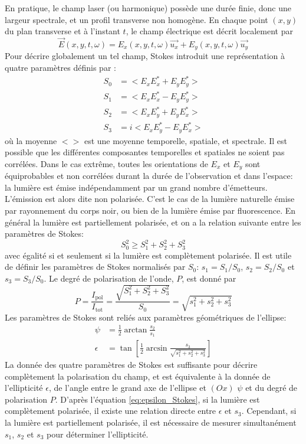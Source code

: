 En pratique, le champ laser (ou harmonique) possède une durée finie, donc une largeur spectrale, et un profil transverse non homogène. En chaque point $(x,y)$ du plan transverse et à l'instant $t$, le champ électrique est décrit localement par
\begin{equation}
\vec{E}(x,y,t,\omega) = E_x(x,y,t,\omega) \vec{u_x} + E_y(x,y,t,\omega) \vec{u_y}
\end{equation}
Pour décrire globalement un tel champ, Stokes introduit une représentation à quatre paramètres définis par :
\begin{align}
S_0 & = <E_x E_x^* + E_y E_y^*> \\
S_1 & = <E_x E_x^* - E_y E_y^*> \\
S_2 & = <E_x E_y^* + E_y E_x^*>\\
S_3 & = i <E_x E_y^* - E_y E_x^*>
\end{align}
où la moyenne $< >$ est une moyenne temporelle, spatiale, et spectrale.
Il est possible que les différentes composantes temporelles et spatiales ne soient pas corrélées. Dans le cas extrême, toutes les orientations de $E_x$ et $E_y$ sont équiprobables et non corrélées durant la durée de l'observation et dans l'espace: la lumière est émise indépendamment par un grand nombre d'émetteurs. L'émission est alors dite non polarisée. C'est le cas de la lumière naturelle émise par rayonnement du corps noir, ou bien de la lumière émise par fluorescence. En général la lumière est partiellement polarisée, et on a la relation suivante entre les paramètres de Stokes:
\begin{equation}
S_0^2 \geqslant S_1^2 + S_2^2 + S_3^2
\end{equation}
avec égalité si et seulement si la lumière est complètement polarisée. Il est utile de définir les paramètres de Stokes normalisés par $S_0$: $s_1 = S_1 /S_0$, $s_2 = S_2 /S_0$ et $s_3 = S_3 /S_0$.
Le degré de polarisation de l'onde, $P$, est donné par 
\begin{equation}
P = \frac{I_{\text{pol}}}{I_{\text{tot}}} = \frac{\sqrt{S_1^2 + S_2^2 + S_3^2}}{S_0} = \sqrt{s_1^2 + s_2^2 + s_3^2}
\label{eq:degrépolarisation}
\end{equation}
Les paramètres de Stokes sont reliés aux paramètres géométriques de l'ellipse:
\begin{align}
\psi & = \frac{1}{2} \arctan \frac{s_2}{s_1} \label{eq:PsiStokes} \\
\epsilon & = \tan \left[ \frac{1}{2} \arcsin \frac{s_3}{\sqrt{s_1^2 + s_2^2 + s_3^2}} \right]
\label{eq:epsilon_Stokes}
\end{align}
La donnée des quatre paramètres de Stokes est suffisante pour décrire complètement la polarisation du champ, et est équivalente à la donnée de l'ellipticité $\epsilon$, de l'angle entre le grand axe de l'ellipse et $(Ox)$ $\psi$ et du degré de polarisation $P$. D'après l'équation \ref{eq:epsilon_Stokes}, si la lumière est complètement polarisée, il existe une relation directe entre $\epsilon$ et $s_3$. Cependant, si la lumière est partiellement polarisée, il est nécessaire de mesurer simultanément $s_1$, $s_2$ et $s_3$ pour déterminer l'ellipticité.

